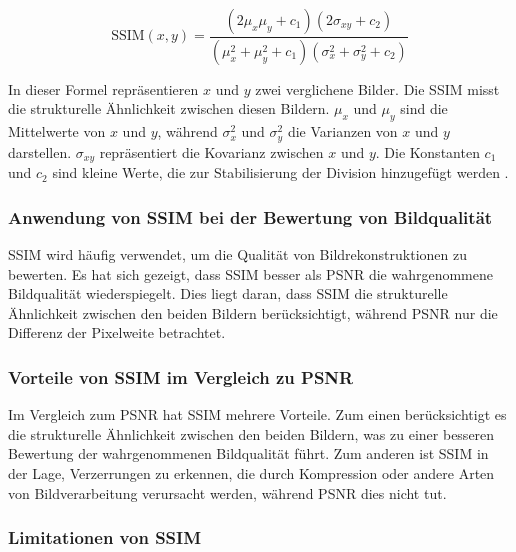         \begin{equation}
            \text{SSIM}(x, y) = \frac{{(2\mu_x\mu_y + c_1)(2\sigma_{xy} + c_2)}}{{(\mu_x^2 + \mu_y^2 + c_1)(\sigma_x^2 + \sigma_y^2 + c_2)}}
        \end{equation}

        In dieser Formel repräsentieren \(x\) und \(y\) zwei verglichene Bilder.
        Die \ac{SSIM} misst die strukturelle Ähnlichkeit zwischen diesen Bildern.
        \(\mu_x\) und \(\mu_y\) sind die Mittelwerte von \(x\) und \(y\), während \(\sigma_x^2\) und \(\sigma_y^2\) die Varianzen von \(x\) und \(y\) darstellen.
        \(\sigma_{xy}\) repräsentiert die Kovarianz zwischen \(x\) und \(y\).
        Die Konstanten \(c_1\) und \(c_2\) sind kleine Werte, die zur Stabilisierung der Division hinzugefügt werden
        .


        \subsubsection{Anwendung von SSIM bei der Bewertung von Bildqualität}
        
            \ac{SSIM} wird häufig verwendet, um die Qualität von Bildrekonstruktionen zu bewerten. Es hat sich gezeigt, dass \ac{SSIM} besser als PSNR die wahrgenommene Bildqualität wiederspiegelt.
            Dies liegt daran, dass \ac{SSIM} die strukturelle Ähnlichkeit zwischen den beiden Bildern berücksichtigt, während \ac{PSNR} nur die Differenz der Pixelweite betrachtet.

        \subsubsection{Vorteile von SSIM im Vergleich zu PSNR}
        
            Im Vergleich zum \ac{PSNR} hat \ac{SSIM} mehrere Vorteile. Zum einen berücksichtigt es die strukturelle Ähnlichkeit zwischen den beiden Bildern, was zu einer besseren Bewertung der wahrgenommenen Bildqualität führt.
            Zum anderen ist \ac{SSIM} in der Lage, Verzerrungen zu erkennen, die durch Kompression oder andere Arten von Bildverarbeitung verursacht werden, während \ac{PSNR} dies nicht tut.
        
        \subsubsection{Limitationen von SSIM}
        
